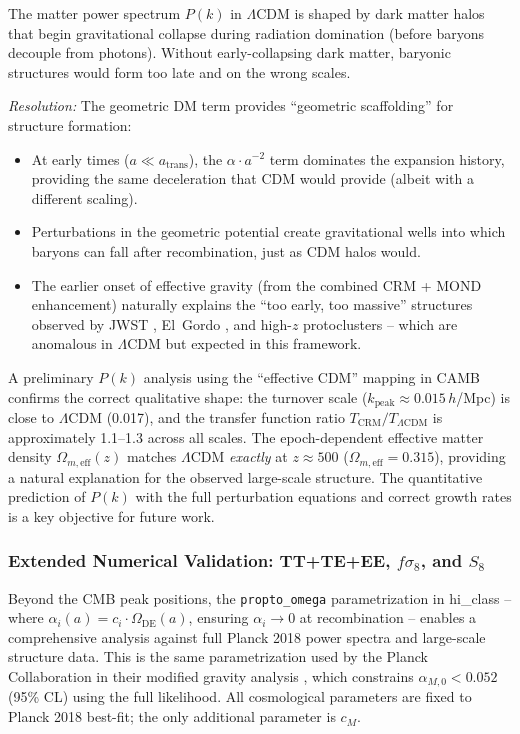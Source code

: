 \documentclass[aps,prd,twocolumn,superscriptaddress,nofootinbib]{revtex4-2}
\begin{document}
The matter power spectrum $P(k)$ in $\Lambda$CDM is shaped by dark matter halos that begin gravitational collapse during radiation domination (before baryons decouple from photons). Without early-collapsing dark matter, baryonic structures would form too late and on the wrong scales.

\textit{Resolution:} The geometric DM term provides ``geometric scaffolding'' for structure formation:
\begin{itemize}
\item At early times ($a \ll a_{\mathrm{trans}}$), the $\alpha \cdot a^{-2}$ term dominates the expansion history, providing the same deceleration that CDM would provide (albeit with a different scaling).
\item Perturbations in the geometric potential create gravitational wells into which baryons can fall after recombination, just as CDM halos would.
\item The earlier onset of effective gravity (from the combined CRM + MOND enhancement) naturally explains the ``too early, too massive'' structures observed by JWST \cite{Labbe2023}, El~Gordo \cite{Asencio2023}, and high-$z$ protoclusters \cite{Miller2018} -- which are anomalous in $\Lambda$CDM but expected in this framework.
\end{itemize}

A preliminary $P(k)$ analysis using the ``effective CDM'' mapping in CAMB \cite{Lewis2000} confirms the correct qualitative shape: the turnover scale ($k_{\mathrm{peak}} \approx 0.015$\,$h$/Mpc) is close to $\Lambda$CDM (0.017), and the transfer function ratio $T_{\mathrm{CRM}}/T_{\Lambda\mathrm{CDM}}$ is approximately 1.1--1.3 across all scales. The epoch-dependent effective matter density $\Omega_{m,\mathrm{eff}}(z)$ matches $\Lambda$CDM \textit{exactly} at $z \approx 500$ ($\Omega_{m,\mathrm{eff}} = 0.315$), providing a natural explanation for the observed large-scale structure. The quantitative prediction of $P(k)$ with the full perturbation equations and correct growth rates is a key objective for future work.

\subsubsection{Extended Numerical Validation: TT+TE+EE, $f\sigma_8$, and $S_8$}
\label{subsubsec:extended_validation}

Beyond the CMB peak positions, the \texttt{propto\_omega} parametrization in hi\_class \cite{Zumalacarregui2017} -- where $\alpha_i(a) = c_i \cdot \Omega_{\mathrm{DE}}(a)$, ensuring $\alpha_i \to 0$ at recombination -- enables a comprehensive analysis against full Planck 2018 power spectra and large-scale structure data. This is the same parametrization used by the Planck Collaboration in their modified gravity analysis \cite{PlanckMG2016}, which constrains $\alpha_{M,0} < 0.052$ (95\% CL) using the full likelihood. All cosmological parameters are fixed to Planck 2018 best-fit; the only additional parameter is $c_M$.
\end{document}
